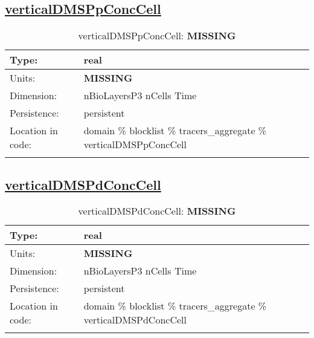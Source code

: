 \subsection[verticalDMSPpConcCell]{\hyperref[sec:var_tab_tracers_aggregate]{verticalDMSPpConcCell}}
\label{subsec:var_sec_tracers_aggregate_verticalDMSPpConcCell}
\begin{center}
\begin{longtable}{| p{2.0in} | p{4.0in} |}
        \hline 
        Type: & real \\
        \hline 
        Units: & {\bf \color{red} MISSING} \\
        \hline 
        Dimension: & nBioLayersP3 nCells Time \\
        \hline 
        Persistence: & persistent \\
        \hline 
         Location in code: & domain \% blocklist \% tracers\_aggregate \% verticalDMSPpConcCell \\
         \hline 
    \caption{verticalDMSPpConcCell: {\bf \color{red} MISSING}}
\end{longtable}
\end{center}
\subsection[verticalDMSPdConcCell]{\hyperref[sec:var_tab_tracers_aggregate]{verticalDMSPdConcCell}}
\label{subsec:var_sec_tracers_aggregate_verticalDMSPdConcCell}
\begin{center}
\begin{longtable}{| p{2.0in} | p{4.0in} |}
        \hline 
        Type: & real \\
        \hline 
        Units: & {\bf \color{red} MISSING} \\
        \hline 
        Dimension: & nBioLayersP3 nCells Time \\
        \hline 
        Persistence: & persistent \\
        \hline 
         Location in code: & domain \% blocklist \% tracers\_aggregate \% verticalDMSPdConcCell \\
         \hline 
    \caption{verticalDMSPdConcCell: {\bf \color{red} MISSING}}
\end{longtable}
\end{center}
